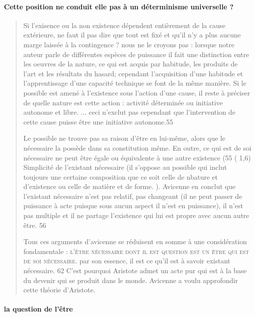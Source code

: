 \paragraph{    Cette position ne conduit elle pas à un déterminisme universelle ?}
\begin{quote}
Si l'exisence ou la non existence dépendent entièrement de la cause extérieure, ne faut il pas dire que tout est fixé et qu'il n'y a plus aucune marge laissée à la contingence ? nous ne le croyons pas : lorsque notre auteur parle de différentes espèces de puissance il fait une distinction entre les oeuvres de la nature, ce qui est acquis par habitude, les produits de l'art et les résultats du hasard; cependant l'acquisition d'une habitude et l'apprentissage d'une capacité technique se font de la même manière. Si le possible est amené à l'existence sous l'action d'une cause, il reste à préciser de quelle nature est cette action : activité déterminée ou initiative autonome et libre.  ... ceci n'exclut pas cependant que l'intervention de cette cause puisse être une initiative autonome.55
    
    Le possible ne trouve pas sa raison d'être en lui-même, alors que le nécessaire la possède dans sa constitution même. En outre, ce qui est de soi nécessaire ne peut être égale ou équivalente à une autre existence (55 ( 1,6)
    Simplicité de l'existant nécessaire (il s'oppose au possible qui inclut toujours une certaine composition que ce soit celle de nbature et d'existence ou celle de matière et de forme. ). 
    Avicenne en conclut que l'existant nécessaire n'est pas relatif, pas changeant (il ne peut passer de puissance à acte puisque sous aucun aspect il n'est en puissance), il n'est pas multiple  et il ne partage l'existence qui lui est propre avec aucun autre être. 56
    
    Tous ces arguments d'avicenne se réduisent en somme à une considération fondamentale : \textsc{l'être nécessaire dont il est question est un être qui est de soi nécessaire}. par son essence, il est ce qu'il est à savoir existant nécessaire. 62
    C'est pourquoi Aristote admet un acte pur qui est à la base du devenir qui se produit dans le monde. Avicenne a voulu approfondir cette théorie d'Aristote.
    

\end{quote}

\paragraph{la question de l'être}

